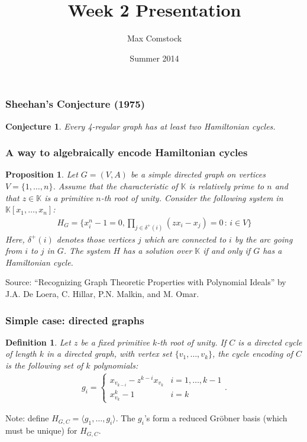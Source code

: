 \documentclass{beamer}
\title{Week 2 Presentation}
\author{Max Comstock}
\date{Summer 2014}
\newtheorem*{conj}{Conjecture}
\newtheorem*{prop}{Proposition}
\newtheorem*{defin}{Definition}
\begin{document}
\frame{\titlepage}

\begin{frame}
\frametitle{Sheehan's Conjecture (1975)}
\begin{conj}
  Every 4-regular graph has at least two Hamiltonian cycles.
\end{conj}
\end{frame}

\begin{frame}
\frametitle{A way to algebraically encode Hamiltonian cycles}
\begin{prop}
  Let $G = (V,A)$ be a simple directed graph on vertices $V = \{1, \ldots, n\}$. Assume that the characteristic of $\mathbb{K}$ is relatively prime to $n$ and that $z \in \mathbb{K}$ is a primitive $n$-th root of unity. Consider the following system in $\mathbb{K}[x_1, \ldots, x_n]$:
  \begin{align*}
    H_G = \{x_i^n - 1 = 0, \prod_{j \in \delta^+(i)} (z x_i - x_j) = 0 \, : \, i \in V\}
  \end{align*}
  Here, $\delta^+(i)$ denotes those vertices $j$ which are connected to $i$ by the arc going from $i$ to $j$ in $G$. The system $H$ has a solution over $\mathbb{K}$ if and only if $G$ has a Hamiltonian cycle.
\end{prop}
Source: ``Recognizing Graph Theoretic Properties with Polynomial Ideals'' by J.A. De Loera, C. Hillar, P.N. Malkin, and M. Omar.
\end{frame}

\begin{frame}
\frametitle{Simple case: directed graphs}
\begin{defin}
  Let $z$ be a fixed primitive $k$-th root of unity. If $C$ is a directed cycle of length $k$ in a directed graph, with vertex set $\{v_1, \ldots, v_k\}$, the cycle encoding of $C$ is the following set of $k$ polynomials:
  \begin{align*}
    g_i = \left \{ \begin{matrix} x_{v_{k-i}} - z^{k-i} x_{v_k} & i = 1, \ldots, k-1\\ x_{v_k}^k - 1 & i = k \end{matrix} \right ..
  \end{align*}
\end{defin}
Note: define $H_{G,C} = \langle g_1,\ldots, g_i \rangle$. The $g_i$'s form a reduced Gr\"obner basis (which must be unique) for $H_{G,C}$.
\end{frame}
\end{document}
